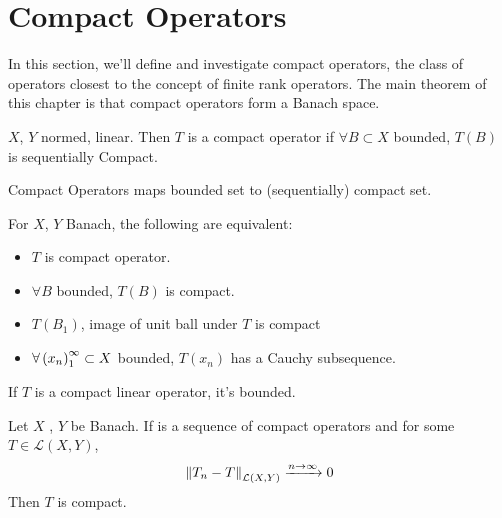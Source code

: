 \newpage
\section{Compact Operators}
In this section, we'll define and investigate compact operators, the class of operators closest to the concept of finite rank operators. The main theorem of this chapter is that compact operators form a Banach space.
\begin{definition}\nl
    $X$, $Y$ normed,  linear. Then $T$ is a compact operator if $\forall B\subset X$ bounded, $T(B)$ is sequentially Compact.
    
\end{definition}

\begin{remark}\nl
    {\color{blue} Compact Operators maps bounded set to (sequentially) compact set.}
\end{remark}

\begin{lemma}\nl
    For $X$, $Y$ Banach, the following are equivalent:
    \begin{itemize}
        \item $T$ is compact operator.
        \item $\forall B$ bounded, $T(B)$ is compact.
        \item $T(B_1)$, image of unit ball under $T$ is compact
        \item $\forall\left({x_n}\right)_1^\infty\subset X$ bounded, $T(x_n)$ has a Cauchy subsequence.
    \end{itemize}
\end{lemma}

\begin{proposition}\nl
    If $T$ is a compact linear operator, it's bounded.
\end{proposition}

\begin{example}\nl
    \placeholder
\end{example}

\begin{theorem}\nl
    Let $X$ , $Y$ be Banach. If  is a sequence of compact operators and for some $T\in\mathcal{L}(X,Y)$,
    $$
    \left\|{T_n-T}\right\|_{\mathcal{L}(X,Y)}\xrightarrow{n\to\infty}{0}
    $$
    Then $T$ is compact.
\end{theorem}

